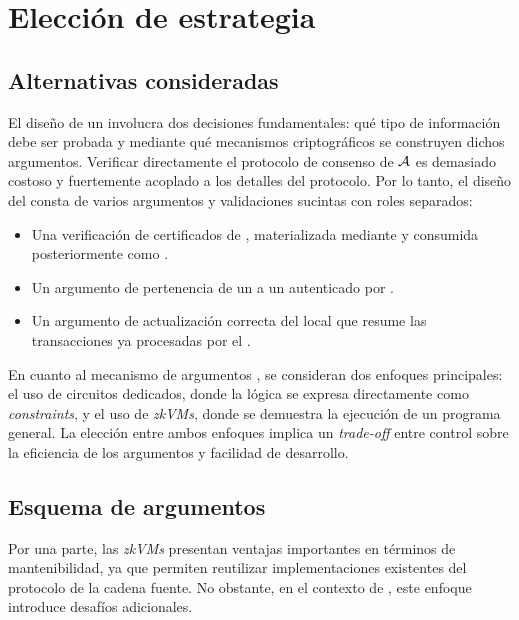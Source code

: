 \section{Elección de estrategia \ZK}
\label{sec:design-decisions-eleccion-de-estrategia-zk}

\subsection{Alternativas consideradas}
\label{subsec:design-decisions-alternativas-consideradas}

El diseño de un \zkBridge involucra dos decisiones fundamentales: qué tipo de información debe ser probada y mediante qué mecanismos criptográficos se construyen dichos argumentos. Verificar directamente el protocolo de consenso de $\mathcal{A}$ es demasiado costoso y fuertemente acoplado a los detalles del protocolo. Por lo tanto, el diseño del \Bridge consta de varios argumentos y validaciones sucintas con roles separados:

	\begin{itemize}[noitemsep]
		\item Una verificación \STM de certificados de \Mithril, materializada mediante \MidnightSTMCircuit y consumida posteriormente como \ProofReceipt.
		\item Un argumento \Groth de pertenencia de un \TxId a un \TransactionSnapshot autenticado por \Mithril.
		\item Un argumento \Groth de actualización correcta del \SMT local que resume las transacciones ya procesadas por el \Bridge.
	\end{itemize}

En cuanto al mecanismo de argumentos \ZK, se consideran dos enfoques principales: el uso de circuitos dedicados, donde la lógica se expresa directamente como \textit{constraints}, y el uso de \textit{zkVMs}, donde se demuestra la ejecución de un programa general. La elección entre ambos enfoques implica un \textit{trade-off} entre control sobre la eficiencia de los argumentos y facilidad de desarrollo.

\subsection{Esquema de argumentos \ZK}
\label{subsec:design-decisions-esquema-de-argumentos-zk}

Por una parte, las \textit{zkVMs} presentan ventajas importantes en términos de mantenibilidad, ya que permiten reutilizar implementaciones existentes del protocolo de la cadena fuente. No obstante, en el contexto de \Cardano, este enfoque introduce desafíos adicionales.

